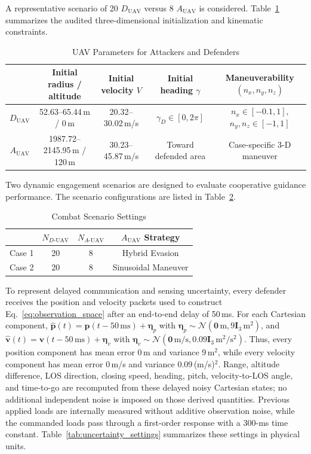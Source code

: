 \documentclass[lettersize,journal]{IEEEtran}
\begin{document}
A representative scenario of 20 $D_{\text{UAV}}$ versus 8 $A_{\text{UAV}}$ is considered.
Table~\ref{chushicanshu} summarizes the audited three-dimensional initialization and
kinematic constraints.

\begin{table}[!t]
\centering
\caption{UAV Parameters for Attackers and Defenders}
\label{chushicanshu}
\renewcommand{\arraystretch}{1.6}
\begin{tabular}{ccccc}
\hline\hline
 & Initial radius / altitude & Initial velocity $V$ & Initial heading $\gamma$ & Maneuverability $(n_x,n_y,n_z)$ \\ \hline
$D_{\text{UAV}}$ & 52.63--65.44\,m / 0\,m & 20.32--30.02\,m/s & $\gamma_D\in[0,2\pi]$ & $n_x\in[-0.1,1]$, $n_y,n_z\in[-1,1]$ \\
$A_{\text{UAV}}$ & 1987.72--2145.95\,m / 120\,m & 30.23--45.87\,m/s & Toward defended area & Case-specific 3-D maneuver \\ \hline
\end{tabular}
\end{table}

Two dynamic engagement scenarios are designed to evaluate cooperative guidance performance.
The scenario configurations are listed in Table~\ref{changjingqingkuang}.

\begin{table}[!t]
\centering
\renewcommand{\arraystretch}{1.4}
\caption{Combat Scenario Settings}
\label{changjingqingkuang}
\begin{tabular}{cccc}
\hline\hline
 & $N_{D\text{-UAV}}$ & $N_{A\text{-UAV}}$ & $A_{\text{UAV}}$ Strategy \\ \hline
Case 1 & 20 & 8 & Hybrid Evasion \\
Case 2 & 20 & 8 & Sinusoidal Maneuver \\ \hline
\end{tabular}
\end{table}

To represent delayed communication and sensing uncertainty, every defender receives the
position and velocity packets used to construct Eq.~\eqref{eq:observation_space} after an
end-to-end delay of 50\,ms. For each Cartesian component,
$\widehat{\mathbf p}(t)=\mathbf p(t-50\,\mathrm{ms})+\boldsymbol\eta_p$ with
$\boldsymbol\eta_p\sim\mathcal N(\mathbf0\,\mathrm{m},9\mathbf I_3\,\mathrm{m}^2)$, and
$\widehat{\mathbf v}(t)=\mathbf v(t-50\,\mathrm{ms})+\boldsymbol\eta_v$ with
$\boldsymbol\eta_v\sim\mathcal N(\mathbf0\,\mathrm{m/s},
0.09\mathbf I_3\,\mathrm{m}^2/\mathrm{s}^2)$. Thus, every position component has mean error
0\,m and variance 9\,m$^2$, while every velocity component has mean error 0\,m/s and variance
0.09\,(m/s)$^2$. Range, altitude difference, LOS direction, closing speed, heading, pitch,
velocity-to-LOS angle, and time-to-go are recomputed from these delayed noisy Cartesian states;
no additional independent noise is imposed on those derived quantities. Previous applied loads
are internally measured without additive observation noise, while the commanded loads pass
through a first-order response with a 300-ms time constant. Table~\ref{tab:uncertainty_settings}
summarizes these settings in physical units.
\end{document}
